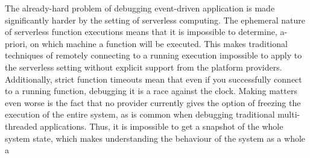 The already-hard problem of debugging event-driven application is made
significantly harder by the setting of serverless computing. The ephemeral
nature of serverless function executions means that it is impossible to
determine, a-priori, on which machine a function will be executed. This makes
traditional techniques of remotely connecting to a running execution impossible
to apply to the serverless setting without explicit support from the platform
providers. Additionally, strict function timeouts mean that even if you
successfully connect to a running function, debugging it is a race against the
clock. Making matters even worse is the fact that no provider currently gives
the option of freezing the execution of the entire system, as is common when
debugging traditional multi-threaded applications. Thus, it is impossible to get
a snapshot of the whole system state, which makes understanding the behaviour of
the system as a whole a 

%
%
%
%

%
%
%
%
